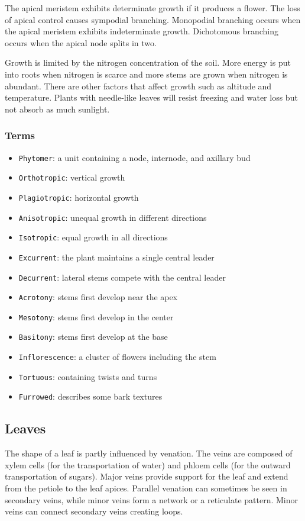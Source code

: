 \documentclass[10pt]{article}
\begin{document}
The apical meristem exhibits determinate growth if it produces a flower. The loss of apical control causes sympodial branching. Monopodial branching occurs when the apical meristem exhibits indeterminate growth. Dichotomous branching occurs when the apical node splits in two.

Growth is limited by the nitrogen concentration of the soil. More energy is put into roots when nitrogen is scarce and more stems are grown when nitrogen is abundant. There are other factors that affect growth such as altitude and temperature. Plants with needle-like leaves will resist freezing and water loss but not absorb as much sunlight.

\subsubsection{Terms}
\begin{itemize}
\item \texttt{Phytomer}: a unit containing a node, internode, and axillary bud
\item \texttt{Orthotropic}: vertical growth
\item \texttt{Plagiotropic}: horizontal growth
\item \texttt{Anisotropic}: unequal growth in different directions
\item \texttt{Isotropic}: equal growth in all directions
\item \texttt{Excurrent}: the plant maintains a single central leader
\item \texttt{Decurrent}: lateral stems compete with the central leader
\item \texttt{Acrotony}: stems first develop near the apex
\item \texttt{Mesotony}: stems first develop in the center
\item \texttt{Basitony}: stems first develop at the base
\item \texttt{Inflorescence}: a cluster of flowers including the stem
\item \texttt{Tortuous}: containing twists and turns
\item \texttt{Furrowed}: describes some bark textures
\end{itemize}

\subsection{Leaves}
The shape of a leaf is partly influenced by venation. The veins are composed of xylem cells (for the transportation of water) and phloem cells (for the outward transportation of sugars). Major veins provide support for the leaf and extend from the petiole to the leaf apices. Parallel venation can sometimes be seen in secondary veins, while minor veins form a network or a reticulate pattern. Minor veins can connect secondary veins creating loops.
\end{document}
